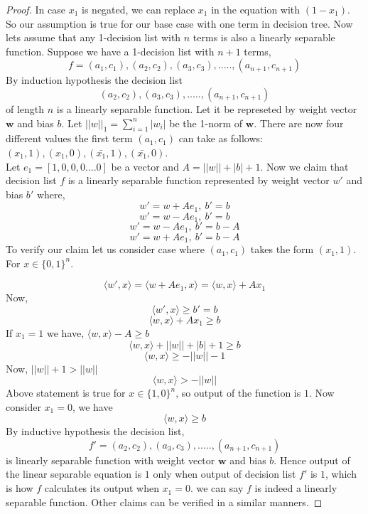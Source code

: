 \begin{proof}
In case $x_1$ is negated, we can replace $x_1$ in the equation with $(1-x_1)$. So our assumption is true for our base case with one term in decision tree. 
Now lets assume that any 1-decision list with $n$ terms is also a linearly separable function. Suppose we have a 1-decision list with $n+1$ terms,
$$f = (a_1, c_1), (a_2,c_2), (a_3,c_3), ..... ,(a_{n+1}, c_{n+1})$$
By induction hypothesis the decision list
$$(a_2,c_2), (a_3,c_3), ..... ,(a_{n+1},c_{n+1})$$ of length $n$ is a linearly separable function. Let it be represeted by weight vector $\boldsymbol w$ and bias $b$. Let $||w||_1 = \sum_{i=1}^{n} |w_i|$ be the 1-norm of $\boldsymbol w$. There are now four different values the first term $(a_1, c_1)$ can take as follows: $(x_1, 1),(x_1, 0),(\bar{x_1}, 1),(\bar{x_1},0)$.\\
Let $e_1 = [1,0,0,0....0]$ be a vector and $A = ||w|| + |b| + 1$. Now we claim that decision list $f$ is a linearly separable function represented by weight vector $w'$ and bias $b'$ where,
$$w' = w + Ae_1, \ b' = b$$
$$w' = w - Ae_1, \ b' = b$$
$$w' = w - Ae_1, \ b' = b - A$$
$$w' = w + Ae_1, \ b' = b - A$$
To verify our claim let us consider case where $(a_1, c_1)$ takes the form $(x_1, 1)$. For $x \in \{0, 1\}^n$.

$$\langle w', x \rangle = \langle w + Ae_1, x \rangle = \langle w,x \rangle + Ax_1$$
Now,
$$\langle w', x \rangle \geq b' = b$$
$$ \langle w,x \rangle + Ax_1 \geq b$$
If $x_1 = 1$ we have, $ \langle w,x \rangle - A \geq b$\\
$$ \langle w,x \rangle + ||w|| + |b| + 1 \geq b$$
$$ \langle w,x \rangle \geq - ||w|| - 1$$
Now, $||w|| + 1 > ||w||$
$$ \langle w,x \rangle > -||w||$$ Above statement is true for $x \in \{1,0\}^n$, so output of the function is $1$. Now consider $x_1 = 0$, we have
$$\langle w,x \rangle \geq b$$
By inductive hypothesis the decision list,
$$f' = (a_2,c_2), (a_3,c_3), ..... ,(a_{n+1},c_{n+1})$$
is linearly separable function with weight vector $\boldsymbol w$ and bias $b$. Hence output of the linear separable equation is $1$ only when output of decision list $f'$ is $1$, which is how $f$ calculates its output when $x_1 = 0$. we can say $f$ is indeed a linearly separable function. Other claims can be verified in a similar manners.





\end{proof}



